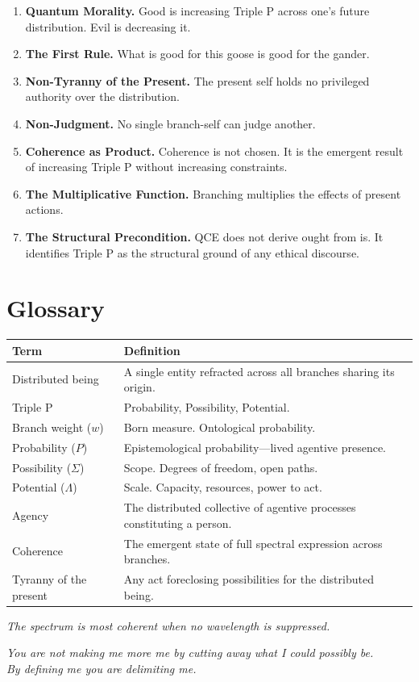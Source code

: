 \documentclass[12pt]{article}
\begin{document}
\begin{enumerate}[label=\Roman*.]
\item \textbf{Quantum Morality.} Good is increasing Triple P across one's future distribution. Evil is decreasing it.
\item \textbf{The First Rule.} What is good for this goose is good for the gander.
\item \textbf{Non-Tyranny of the Present.} The present self holds no privileged authority over the distribution.
\item \textbf{Non-Judgment.} No single branch-self can judge another.
\item \textbf{Coherence as Product.} Coherence is not chosen. It is the emergent result of increasing Triple P without increasing constraints.
\item \textbf{The Multiplicative Function.} Branching multiplies the effects of present actions.
\item \textbf{The Structural Precondition.} QCE does not derive ought from is. It identifies Triple P as the structural ground of any ethical discourse.
\end{enumerate}

\section{Glossary}

\begin{tabular}{lp{10cm}}
\toprule
\textbf{Term} & \textbf{Definition} \\
\midrule
Distributed being & A single entity refracted across all branches sharing its origin. \\
Triple P & Probability, Possibility, Potential. \\
Branch weight ($w$) & Born measure. Ontological probability. \\
Probability ($P$) & Epistemological probability---lived agentive presence. \\
Possibility ($\Sigma$) & Scope. Degrees of freedom, open paths. \\
Potential ($\Lambda$) & Scale. Capacity, resources, power to act. \\
Agency & The distributed collective of agentive processes constituting a person. \\
Coherence & The emergent state of full spectral expression across branches. \\
Tyranny of the present & Any act foreclosing possibilities for the distributed being. \\
\bottomrule
\end{tabular}

\vfill
\begin{center}
\textit{The spectrum is most coherent when no wavelength is suppressed.}

\medskip
\textit{You are not making me more me by cutting away what I could possibly be.\\
By defining me you are delimiting me.}
\end{center}
\end{document}
